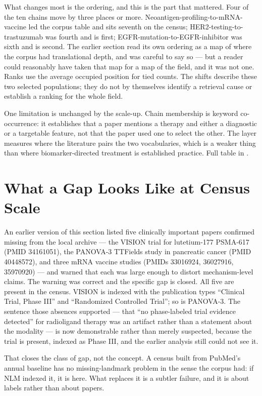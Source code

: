\documentclass[11pt,twoside,openright]{report}
\begin{document}
What changes most is the ordering, and this is the part that mattered. Four of the ten chains move by three places or more. Neoantigen-profiling-to-mRNA-vaccine led the corpus table and sits seventh on the census; HER2-testing-to-trastuzumab was fourth and is first; EGFR-mutation-to-EGFR-inhibitor was sixth and is second. The earlier section read its own ordering as a map of where the corpus had translational depth, and was careful to say so --- but a reader could reasonably have taken that map for a map of the field, and it was not one. Ranks use the average occupied position for tied counts. The shifts describe these two selected populations; they do not by themselves identify a retrieval cause or establish a ranking for the whole field.

One limitation is unchanged by the scale-up. Chain membership is keyword co-occurrence: it establishes that a paper mentions a therapy and either a diagnostic or a targetable feature, not that the paper used one to select the other. The layer measures where the literature pairs the two vocabularies, which is a weaker thing than where biomarker-directed treatment is established practice. Full table in .

\section{What a Gap Looks Like at Census Scale}

An earlier version of this section listed five clinically important papers confirmed missing from the local archive --- the VISION trial for lutetium-177 PSMA-617 (PMID 34161051), the PANOVA-3 TTFields study in pancreatic cancer (PMID 40448572), and three mRNA vaccine studies (PMIDs 33016924, 36027916, 35970920) --- and warned that each was large enough to distort mechanism-level claims. The warning was correct and the specific gap is closed. All five are present in the census. VISION is indexed with the publication types ``Clinical Trial, Phase III'' and ``Randomized Controlled Trial''; so is PANOVA-3. The sentence those absences supported --- that ``no phase-labeled trial evidence detected'' for radioligand therapy was an artifact rather than a statement about the modality --- is now demonstrable rather than merely suspected, because the trial is present, indexed as Phase III, and the earlier analysis still could not see it.

That closes the class of gap, not the concept. A census built from PubMed's annual baseline has no missing-landmark problem in the sense the corpus had: if NLM indexed it, it is here. What replaces it is a subtler failure, and it is about labels rather than about papers.
\end{document}
